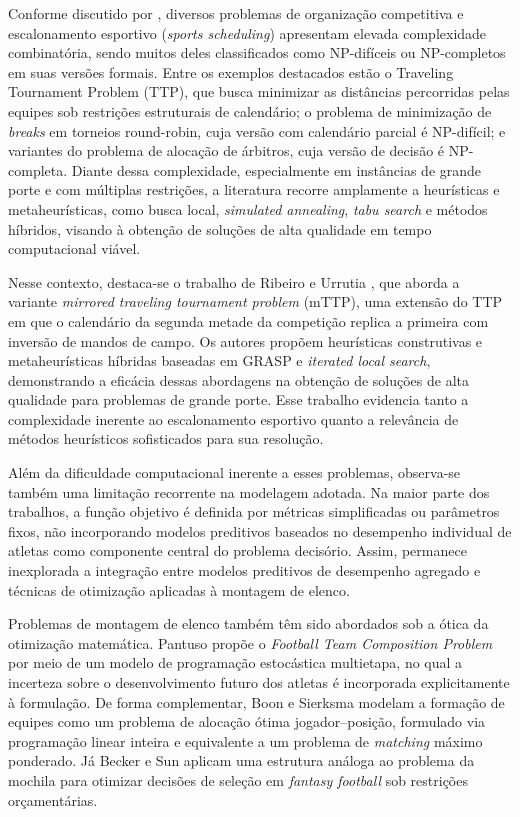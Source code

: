 Conforme discutido por \cite{Kendall2010}, diversos problemas de organização competitiva e escalonamento esportivo (\textit{sports scheduling}) 
apresentam elevada complexidade combinatória, sendo muitos deles classificados como NP-difíceis ou NP-completos em suas versões formais. 
Entre os exemplos destacados estão o Traveling Tournament Problem (TTP), que busca minimizar as distâncias percorridas pelas equipes sob restrições 
estruturais de calendário; o problema de minimização de \textit{breaks} em torneios round-robin, cuja versão com calendário parcial é NP-difícil; 
e variantes do problema de alocação de árbitros, cuja versão de decisão é NP-completa. Diante dessa complexidade, especialmente em instâncias 
de grande porte e com múltiplas restrições, a literatura recorre amplamente a heurísticas e metaheurísticas, como busca local, \textit{simulated annealing}, 
\textit{tabu search} e métodos híbridos, visando à obtenção de soluções de alta qualidade em tempo computacional viável.

Nesse contexto, destaca-se o trabalho de Ribeiro e Urrutia \cite{Ribeiro2007}, que aborda a 
variante \textit{mirrored traveling tournament problem} (mTTP), uma extensão do TTP em que o 
calendário da segunda metade da competição replica a primeira com inversão de mandos de campo. 
Os autores propõem heurísticas construtivas e metaheurísticas híbridas baseadas em 
GRASP e \textit{iterated local search}, demonstrando a eficácia dessas abordagens na 
obtenção de soluções de alta qualidade para problemas de grande porte. Esse trabalho 
evidencia tanto a complexidade inerente ao escalonamento esportivo quanto a relevância 
de métodos heurísticos sofisticados para sua resolução.

Além da dificuldade computacional inerente a esses problemas, observa-se também uma limitação recorrente na modelagem adotada. 
Na maior parte dos trabalhos, a função objetivo é definida por métricas simplificadas ou parâmetros fixos, não incorporando modelos preditivos 
baseados no desempenho individual de atletas como componente central do problema decisório. Assim, permanece inexplorada a integração entre 
modelos preditivos de desempenho agregado e técnicas de otimização aplicadas à montagem de elenco.

Problemas de montagem de elenco também têm sido abordados sob a ótica da otimização matemática. Pantuso \cite{Pantuso2017} propõe o 
\textit{Football Team Composition Problem} por meio de um modelo de programação estocástica multietapa, no qual a incerteza sobre o desenvolvimento 
futuro dos atletas é incorporada explicitamente à formulação. De forma complementar, Boon e Sierksma \cite{Boon2003} modelam a formação de equipes 
como um problema de alocação ótima jogador–posição, formulado via programação linear inteira e equivalente a um problema de \textit{matching} máximo ponderado. 
Já Becker e Sun \cite{Becker2015} aplicam uma estrutura análoga ao problema da mochila para otimizar decisões de seleção em \textit{fantasy football} 
sob restrições orçamentárias.

